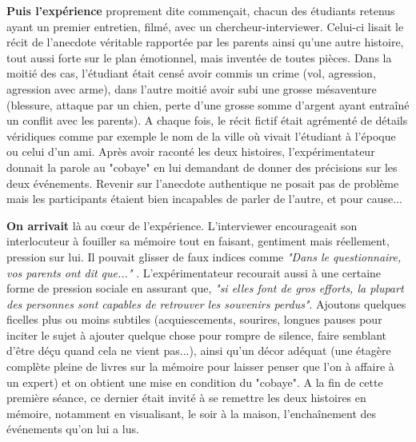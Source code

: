 \documentclass[11pt,twoside,a4paper]{article}
\begin{document}
\textbf{Puis l'exp{\'e}rience} proprement dite commen\c{c}ait, chacun des {\'e}tudiants retenus ayant un premier entretien, film{\'e}, avec un chercheur-interviewer. Celui-ci lisait le r{\'e}cit de l'anecdote v{\'e}ritable rapport{\'e}e par les parents ainsi qu'une autre histoire, tout aussi forte sur le plan {\'e}motionnel, mais invent{\'e}e de toutes pi{\`e}ces. Dans la moiti{\'e} des cas, l'{\'e}tudiant {\'e}tait cens{\'e} avoir commis un crime (vol, agression, agression avec arme), dans l'autre moiti{\'e} avoir subi une grosse m{\'e}saventure (blessure, attaque par un chien, perte d'une grosse somme d'argent ayant entra{\^i}n{\'e} un conflit avec les parents). A chaque fois, le r{\'e}cit fictif {\'e}tait agr{\'e}ment{\'e} de d{\'e}tails v{\'e}ridiques comme par exemple le nom de la ville o{\`u} vivait l'{\'e}tudiant {\`a} l'{\'e}poque ou celui d'un ami. Apr{\`e}s avoir racont{\'e} les deux histoires, l'exp{\'e}rimentateur donnait la parole au "cobaye" en lui demandant de donner des pr{\'e}cisions sur les deux {\'e}v{\'e}nements. Revenir sur l'anecdote authentique ne posait pas de probl{\`e}me mais les participants {\'e}taient bien incapables de parler de l'autre, et pour cause...~\\

\clearpage

\textbf{On arrivait} l{\`a} au c\oe ur de l'exp{\'e}rience. L'interviewer encourageait son interlocuteur {\`a} fouiller sa m{\'e}moire tout en faisant, gentiment mais r{\'e}ellement, pression sur lui. Il pouvait glisser de faux indices comme \emph{"Dans le questionnaire, vos parents ont dit que..."} . L'exp{\'e}rimentateur recourait aussi {\`a} une certaine forme de pression sociale en assurant que, \emph{"si elles font de gros efforts, la plupart des personnes sont capables de retrouver les souvenirs perdus"}. Ajoutons quelques ficelles plus ou moins subtiles (acquiescements, sourires, longues pauses pour inciter le sujet {\`a} ajouter quelque chose pour rompre de silence, faire semblant d'{\^e}tre d{\'e}\c{c}u quand cela ne vient pas...), ainsi qu'un d{\'e}cor ad{\'e}quat (une {\'e}tag{\`e}re compl{\`e}te pleine de livres sur la m{\'e}moire pour laisser penser que l'on {\`a} affaire {\`a} un expert) et on obtient une mise en condition du "cobaye". A la fin de cette premi{\`e}re s{\'e}ance, ce dernier {\'e}tait invit{\'e} {\`a} se remettre les deux histoires en m{\'e}moire, notamment en visualisant, le soir {\`a} la maison, l'encha{\^i}nement des {\'e}v{\'e}nements qu'on lui a lus.~\\
\end{document}
